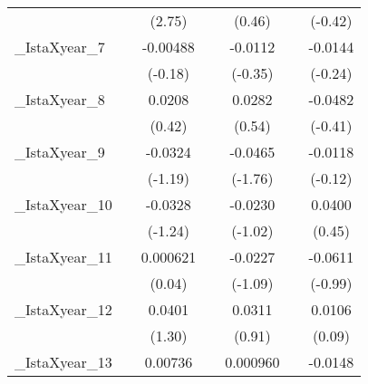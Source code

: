 {\begin{tabular}{l*{6}{c}}
            &                     &      (2.75)         &                     &      (0.46)         &                     &     (-0.42)         \\
[1em]
\_IstaXyear\_7&                     &    -0.00488         &                     &     -0.0112         &                     &     -0.0144         \\
            &                     &     (-0.18)         &                     &     (-0.35)         &                     &     (-0.24)         \\
[1em]
\_IstaXyear\_8&                     &      0.0208         &                     &      0.0282         &                     &     -0.0482         \\
            &                     &      (0.42)         &                     &      (0.54)         &                     &     (-0.41)         \\
[1em]
\_IstaXyear\_9&                     &     -0.0324         &                     &     -0.0465         &                     &     -0.0118         \\
            &                     &     (-1.19)         &                     &     (-1.76)         &                     &     (-0.12)         \\
[1em]
\_IstaXyear\_10&                     &     -0.0328         &                     &     -0.0230         &                     &      0.0400         \\
            &                     &     (-1.24)         &                     &     (-1.02)         &                     &      (0.45)         \\
[1em]
\_IstaXyear\_11&                     &    0.000621         &                     &     -0.0227         &                     &     -0.0611         \\
            &                     &      (0.04)         &                     &     (-1.09)         &                     &     (-0.99)         \\
[1em]
\_IstaXyear\_12&                     &      0.0401         &                     &      0.0311         &                     &      0.0106         \\
            &                     &      (1.30)         &                     &      (0.91)         &                     &      (0.09)         \\
[1em]
\_IstaXyear\_13&                     &     0.00736         &                     &    0.000960         &                     &     -0.0148         \\

\end{tabular}}

